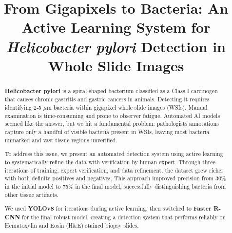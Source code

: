 \documentclass[conference]{IEEEtran}
\begin{document}
\title[H. pylori Detection via Active Learning]{From Gigapixels to Bacteria: An Active Learning System for \textit{Helicobacter pylori} Detection in Whole Slide Images}





\begin{abstract}
\textbf{Helicobacter pylori} is a spiral-shaped bacterium classified as a Class I carcinogen that causes chronic gastritis and gastric cancers in animals. Detecting it requires identifying 2-5 $\mu$m bacteria within gigapixel whole slide images (WSIs). Manual examination is time-consuming and prone to observer fatigue. Automated AI models seemed like the answer, but we hit a fundamental problem: pathologists annotations capture only a handful of visible bacteria present in WSIs, leaving most bacteria unmarked and vast tissue regions unverified.

To address this issue, we present an automated detection system using active learning to systematically refine the data with verification by human expert. Through three iterations of training, expert verification, and data refinement, the dataset grew richer with both definite positives and  negatives. This approach improved precision from 30\% in the initial model to 75\% in the final
model, successfully distinguishing bacteria from other tissue artifacts.

We used \textbf{YOLOv8} for iterations during active learning, then switched to \textbf{Faster R-CNN} for the final robust model, creating a detection system that performs reliably on Hematoxylin and Eosin (H\&E) stained biopsy slides.
\end{abstract}

\end{document}
